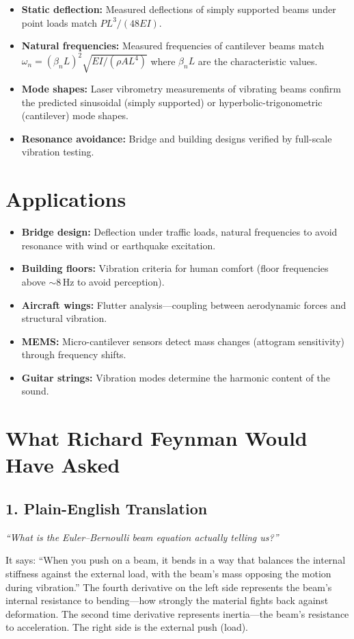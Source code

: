 \documentclass[11pt,openright]{book}
\begin{document}
\begin{itemize}
\item \textbf{Static deflection:} Measured deflections of simply supported beams under point loads match $PL^3/(48EI)$.
\item \textbf{Natural frequencies:} Measured frequencies of cantilever beams match $\omega_n = (\beta_n L)^2 \sqrt{EI/(\rho A L^4)}$ where $\beta_n L$ are the characteristic values.
\item \textbf{Mode shapes:} Laser vibrometry measurements of vibrating beams confirm the predicted sinusoidal (simply supported) or hyperbolic-trigonometric (cantilever) mode shapes.
\item \textbf{Resonance avoidance:} Bridge and building designs verified by full-scale vibration testing.
\end{itemize}
\section*{Applications}

\begin{itemize}
\item \textbf{Bridge design:} Deflection under traffic loads, natural frequencies to avoid resonance with wind or earthquake excitation.
\item \textbf{Building floors:} Vibration criteria for human comfort (floor frequencies above $\sim$8\,Hz to avoid perception).
\item \textbf{Aircraft wings:} Flutter analysis---coupling between aerodynamic forces and structural vibration.
\item \textbf{MEMS:} Micro-cantilever sensors detect mass changes (attogram sensitivity) through frequency shifts.
\item \textbf{Guitar strings:} Vibration modes determine the harmonic content of the sound.
\end{itemize}
\section*{What Richard Feynman Would Have Asked}

\subsection*{1. Plain-English Translation}
\textit{``What is the Euler--Bernoulli beam equation actually telling us?''}

It says: ``When you push on a beam, it bends in a way that balances the internal stiffness against the external load, with the beam's mass opposing the motion during vibration.'' The fourth derivative on the left side represents the beam's internal resistance to bending---how strongly the material fights back against deformation. The second time derivative represents inertia---the beam's resistance to acceleration. The right side is the external push (load).
\end{document}
